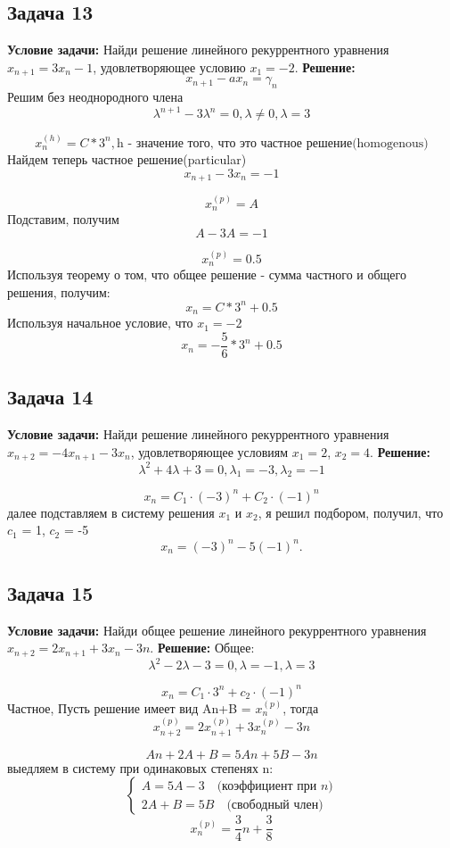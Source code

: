 \documentclass[a4paper,12pt]{article}
\begin{document}
\vspace{1cm}

\subsection{Задача 13}
\textbf{Условие задачи:}
Найди решение линейного рекуррентного уравнения \(x_{n+1} = 3x_n - 1\), удовлетворяющее условию \(x_1 = -2\).
\textbf{Решение: }
\[
x_{n+1} - ax_{n} = \gamma_n
\]
Решим без неоднородного члена
\[
\lambda^{n+1}-3\lambda^n=0, \lambda \ne 0, \lambda = 3
\]

\[
x_n^{(h)}=C*3^n, \text{h - значение того, что это частное решение(homogenous)}
\]
Найдем теперь частное решение(particular)
\[
x_{n+1} - 3x_n = -1
\]

\[
x_n^{(p)} = A
\]
Подставим, получим
\[
A-3A=-1
\]

\[
x_n^{(p)} = 0.5
\]
Используя теорему о том, что общее решение - сумма частного и общего решения, получим:
\[
x_n = C*3^n+0.5
\]
Используя начальное условие, что $x_1=-2$
\[
x_n = -\frac{5}{6}*3^n+0.5
\]
\vspace{1cm}

\subsection{Задача 14}
\textbf{Условие задачи:}
Найди решение линейного рекуррентного уравнения \(x_{n+2} = -4x_{n+1} - 3x_n\), удовлетворяющее условиям \(x_1 = 2\), \(x_2 = 4\).
\textbf{Решение: }
\[
\lambda^2+4\lambda+3=0, \lambda_1 = -3, \lambda_2=-1
\]

\[
x_n = C_1\cdot (-3)^n+ C_2\cdot (-1)^n
\]
далее подставляем в систему решения $x_1$ и $x_2$, я решил подбором, получил, что $c_1$ = 1, $c_2$ = -5
\[
x_n = (-3)^n - 5(-1)^n.
\]
\vspace{1cm}

\subsection{Задача 15}
\textbf{Условие задачи:}
Найди общее решение линейного рекуррентного уравнения \(x_{n+2} = 2x_{n+1} + 3x_n - 3n\).
\textbf{Решение:}
Общее:
\[
\lambda^2-2\lambda -3 = 0, \lambda = -1, \lambda =  3
\]

\[
x_n = C_1 \cdot 3^n + c_2 \cdot (-1)^n
\]
Частное, Пусть решение имеет вид An+B = $x_n^{(p)}$, тогда
\[
x_{n+2}^{(p)} = 2x_{n+1}^{(p)} + 3x_n^{(p)} - 3n
\]

\[
An + 2A + B = 5An + 5B - 3n
\]
выедляем в систему при одинаковых степенях n:
\[
\begin{cases}
A = 5A - 3 \quad \text{(коэффициент при \(n\))} \\
2A + B = 5B \quad \text{(свободный член)}
\end{cases}
\]
\[
x_n^{(p)} = \frac{3}{4}n + \frac{3}{8}
\]
\end{document}
